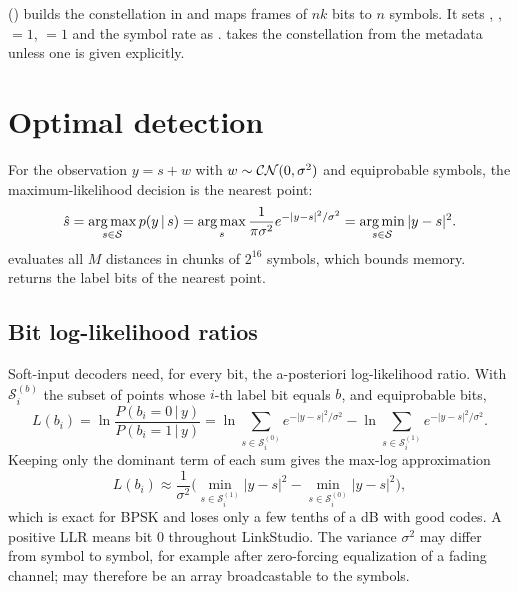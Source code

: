 
\begin{incode}
 () builds the constellation in  and maps
frames of $n k$ bits to $n$ symbols. It sets , ,
$=1$, $=1$ and the symbol rate  as .
 takes the constellation from the metadata unless one is given explicitly.
\end{incode}

\section{Optimal detection}
For the observation $y=s+w$ with $w\sim\mathcal{CN}(0,\sigma^2)$ and equiprobable symbols, the
maximum-likelihood decision is the nearest point:
\begin{equation}
  \hat s=\operatorname*{arg\,max}_{s\in\mathcal{S}} p(y\,|\,s)=\operatorname*{arg\,max}_{s}\frac{1}{\pi\sigma^2}e^{-|y-s|^2/\sigma^2}
  =\operatorname*{arg\,min}_{s\in\mathcal{S}}|y-s|^2 .
\end{equation}
 evaluates all $M$ distances in chunks of $2^{16}$ symbols, which
bounds memory.  returns the label bits of the nearest point.

\subsection{Bit log-likelihood ratios}\label{sec:llr}
Soft-input decoders need, for every bit, the a-posteriori log-likelihood ratio. With
$\mathcal{S}_i^{(b)}$ the subset of points whose $i$-th label bit equals $b$, and equiprobable
bits,
\begin{equation}
  L(b_i)=\ln\frac{P(b_i=0\,|\,y)}{P(b_i=1\,|\,y)}
  =\ln\!\sum_{s\in\mathcal{S}_i^{(0)}}\!e^{-|y-s|^2/\sigma^2}
   -\ln\!\sum_{s\in\mathcal{S}_i^{(1)}}\!e^{-|y-s|^2/\sigma^2}.
  \label{eq:llr-exact}
\end{equation}
Keeping only the dominant term of each sum gives the max-log approximation
\begin{equation}
  L(b_i)\approx\frac{1}{\sigma^2}\Big(\min_{s\in\mathcal{S}_i^{(1)}}|y-s|^2-\min_{s\in\mathcal{S}_i^{(0)}}|y-s|^2\Big),
  \label{eq:llr-maxlog}
\end{equation}
which is exact for BPSK and loses only a few tenths of a dB with good codes. A positive LLR
means bit $0$ throughout LinkStudio. The variance $\sigma^2$ may differ from symbol to symbol, for
example after zero-forcing equalization of a fading channel;  may therefore be
an array broadcastable to the symbols.

